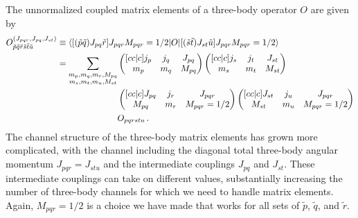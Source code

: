 The unnormalized coupled matrix elements of a three-body operator $O$
are given by
\begin{align}
  \phantom{O^{(J_{pqr}, J_{pq}, J_{st})}_{\tilde{p}\tilde{q}\tilde{r}\tilde{s}\tilde{t}\tilde{u}}}
   & \begin{aligned}
    \mathllap{O^{(J_{pqr}, J_{pq}, J_{st})}_{\tilde{p}\tilde{q}\tilde{r}\tilde{s}\tilde{t}\tilde{u}}}
    \equiv \braket{
    [(\tilde{p} \tilde{q})J_{pq} \tilde{r}] J_{pqr} M_{pqr} = 1/2 |
    O
    | [(\tilde{s} \tilde{t})J_{st} \tilde{u}] J_{pqr} M_{pqr} = 1/2
    }
  \end{aligned} \\
   & \begin{aligned}
    \mathllap{}
    = \sum_{\substack{m_p,m_q,m_r,M_{pq}                     \\ m_s,m_t,m_u,M_{st}}} &
    \cgsymbol{j_p}{j_q}{J_{pq}}{m_p}{m_q}{M_{pq}}
    \cgsymbol{j_s}{j_t}{J_{st}}{m_s}{m_t}{M_{st}}            \\
     & \cgsymbol{J_{pq}}{j_r}{J_{pqr}}{M_{pq}}{m_r}{M_{pqr}=1/2}
    \cgsymbol{J_{st}}{j_u}{J_{pqr}}{M_{st}}{m_u}{M_{pqr}=1/2}    \\
     & O_{pqrstu}
    \,.
  \end{aligned}
\end{align}
The channel structure of the three-body matrix elements
has grown more complicated,
with the channel including the diagonal total three-body angular momentum
$J_{pqr} = J_{stu}$
and the intermediate couplings $J_{pq}$ and $J_{st}$.
These intermediate couplings can take on different values,
substantially increasing the number of three-body channels
for which we need to handle matrix elements.
Again, $M_{pqr} = 1/2$ is a choice we have made that works
for all sets of $\tilde{p}$, $\tilde{q}$, and $\tilde{r}$.

